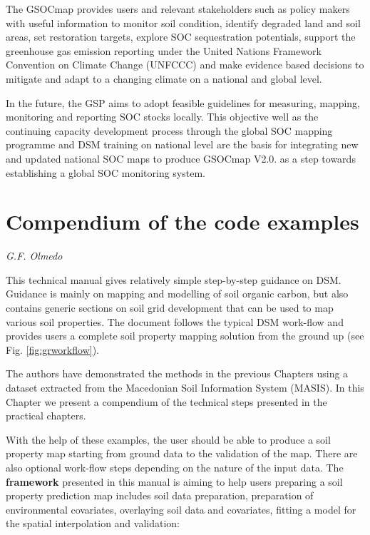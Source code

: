 \documentclass[10pt,b5paper,]{book}
\theoremstyle{definition}
\theoremstyle{definition}
\theoremstyle{definition}
\theoremstyle{remark}
\begin{document}
The GSOCmap provides users and relevant stakeholders such as policy
makers with useful information to monitor soil condition, identify
degraded land and soil areas, set restoration targets, explore SOC
sequestration potentials, support the greenhouse gas emission reporting
under the United Nations Framework Convention on Climate Change (UNFCCC)
and make evidence based decisions to mitigate and adapt to a changing
climate on a national and global level.

In the future, the GSP aims to adopt feasible guidelines for measuring,
mapping, monitoring and reporting SOC stocks locally. This objective
well as the continuing capacity development process through the global
SOC mapping programme and DSM training on national level are the basis
for integrating new and updated national SOC maps to produce GSOCmap
V2.0. as a step towards establishing a global SOC monitoring system.

\hypertarget{compendium}{%
\chapter{Compendium of the code examples}\label{compendium}}

\emph{G.F. Olmedo}

This technical manual gives relatively simple step-by-step guidance on
DSM. Guidance is mainly on mapping and modelling of soil organic carbon,
but also contains generic sections on soil grid development that can be
used to map various soil properties. The document follows the typical
DSM work-flow and provides users a complete soil property mapping
solution from the ground up (see Fig. \ref{fig:grworkflow}).

The authors have demonstrated the methods in the previous Chapters using
a dataset extracted from the Macedonian Soil Information System (MASIS).
In this Chapter we present a compendium of the technical steps presented
in the practical chapters.

With the help of these examples, the user should be able to produce a
soil property map starting from ground data to the validation of the
map. There are also optional work-flow steps depending on the nature of
the input data. The \textbf{framework} presented in this manual is
aiming to help users preparing a soil property prediction map includes
soil data preparation, preparation of environmental covariates,
overlaying soil data and covariates, fitting a model for the spatial
interpolation and validation:
\end{document}
